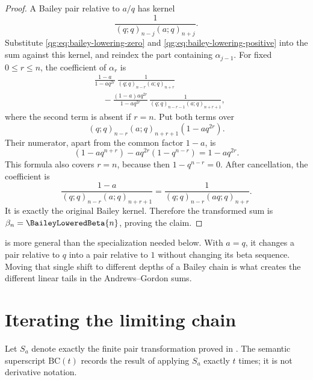 \begin{proof}
A Bailey pair relative to \(a/q\) has kernel
\[
  \frac{1}{(q;q)_{n-j}(a;q)_{n+j}}.
\]
Substitute \eqref{qg:eq:bailey-lowering-zero} and
\eqref{qg:eq:bailey-lowering-positive} into the sum against this
kernel, and reindex the part containing \(\alpha_{j-1}\).  For fixed
\(0\le r\le n\), the coefficient of \(\alpha_r\) is
\begin{align*}
 &\frac{1-a}{1-aq^{2r}}\,
  \frac{1}{(q;q)_{n-r}(a;q)_{n+r}}\\
 &\quad-
 \frac{(1-a)aq^{2r}}{1-aq^{2r}}\,
 \frac{1}{(q;q)_{n-r-1}(a;q)_{n+r+1}},
\end{align*}
where the second term is absent if \(r=n\).  Put both terms over
\[
 (q;q)_{n-r}(a;q)_{n+r+1}(1-aq^{2r}).
\]
Their numerator, apart from the common factor \(1-a\), is
\[
 (1-aq^{n+r})-aq^{2r}(1-q^{n-r})
 =1-aq^{2r}.
\]
This formula also covers \(r=n\), because then \(1-q^{n-r}=0\).
After cancellation, the coefficient is
\[
 \frac{1-a}{(q;q)_{n-r}(a;q)_{n+r+1}}
 =
 \frac{1}{(q;q)_{n-r}(aq;q)_{n+r}}.
\]
It is exactly the original Bailey kernel.  Therefore the transformed sum is
\(\beta_n=\BaileyLoweredBeta{n}\), proving the claim.
\end{proof}

\begin{remark}
 is more general than the
specialization needed below.  With \(a=q\), it changes a pair relative to
\(q\) into a pair relative to \(1\) without changing its beta sequence.
Moving that single shift to different depths of a Bailey chain is what
creates the different linear tails in the Andrews--Gordon sums.
\end{remark}

\section{Iterating the limiting chain}
\label{qg:sec:iterated-bailey-chain}

Let \(S_a\) denote exactly the finite pair transformation proved in
.  The semantic superscript
\(\mathrm{BC}(t)\) records the result of applying \(S_a\) exactly \(t\)
times; it is not derivative notation.

